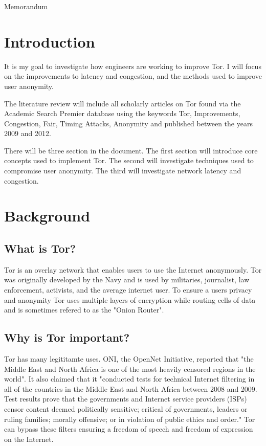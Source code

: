 \documentclass[letterpaper,12pt]{texMemo}
\begin{document}
\begin{center}
\large Memorandum
\end{center}
\singlespace
\maketitle
\section*{Introduction}

It is my goal to investigate how engineers are working to improve Tor. I will focus on the
improvements to latency and congestion, and the methods used to improve user anonymity.

The literature review will include all scholarly articles on Tor found via the Academic Search
Premier database using the keywords Tor, Improvements, Congestion, Fair, Timing Attacks,
Anonymity and published between the years 2009 and 2012.

There will be three section in the document. The first section will introduce core concepts used
to implement Tor. The second will investigate techniques used to compromise user
anonymity. The third will investigate network latency and congestion.

\section*{Background}

    \subsection*{What is Tor?}
    Tor is an overlay network that enables users to use the Internet anonymously. Tor was originally
    developed by the Navy and is used by militaries, journalist, law enforcement, activists, and the
    average internet user\citep[2]{tor:web}. To ensure a users privacy and anonymity Tor uses multiple
    layers of encryption while routing cells of data and is sometimes refered to as the "Onion Router".

    \subsection*{Why is Tor important?}
    Tor has many legititamte uses. ONI, the OpenNet Initiative, reported that "the Middle East and
    North Africa is one of the most heavily censored regions in the world". It also claimed that it
    "conducted tests for technical Internet filtering in all of the countries in the Middle East
    and North Africa between 2008 and 2009. Test results prove that the governments and Internet
    service providers (ISPs) censor content deemed politically sensitive; critical of governments,
    leaders or ruling families; morally offensive; or in violation of public ethics and order." Tor
    can bypass these filters ensuring a freedom of speech and freedom of expression on the Internet.
\end{document}
